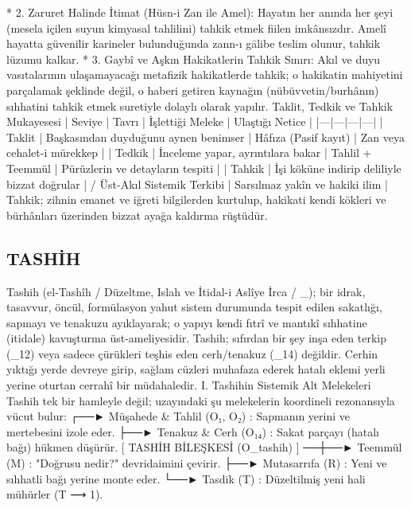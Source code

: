 \documentclass[11pt,a4paper]{article}
\begin{document}
 * 2. Zaruret Halinde İtimat (Hüsn-i Zan ile Amel):
   Hayatın her anında her şeyi (mesela içilen suyun kimyasal tahlilini) tahkik etmek fiilen imkânsızdır. Amelî hayatta güvenilir karineler bulunduğunda zann-ı gālibe teslim olunur, tahkik lüzumu kalkar.
 * 3. Gaybî ve Aşkın Hakikatlerin Tahkik Sınırı:
   Akıl ve duyu vasıtalarının ulaşamayacağı metafizik hakikatlerde tahkik; o hakikatin mahiyetini parçalamak şeklinde değil, o haberi getiren kaynağın (nübüvvetin/burhânın) sıhhatini tahkik etmek suretiyle dolaylı olarak yapılır.
Taklit, Tedkik ve Tahkik Mukayesesi
| Seviye | Tavrı | İşlettiği Meleke | Ulaştığı Netice |
|---|---|---|---|
| Taklit | Başkasından duyduğunu aynen benimser | Hâfıza (Pasif kayıt) | Zan veya cehalet-i mürekkep |
| Tedkik | İnceleme yapar, ayrıntılara bakar | Tahlil + Teemmül | Pürüzlerin ve detayların tespiti |
| Tahkik | İşi köküne indirip deliliyle bizzat doğrular |  / Üst-Akıl Sistemik Terkibi | Sarsılmaz yakîn ve hakiki ilim |
Tahkik; zihnin emanet ve iğreti bilgilerden kurtulup, hakikati kendi kökleri ve bürhânları üzerinden bizzat ayağa kaldırma rüştüdür.






\subsection{TASHİH}


Tashih (el-Tashîh / Düzeltme, Islah ve İtidal-i Aslîye İrca / _{}); bir idrak, tasavvur, öncül, formülasyon yahut sistem durumunda tespit edilen sakatlığı, sapmayı ve tenakuzu ayıklayarak; o yapıyı kendi fıtrî ve mantıkî sıhhatine (itidale) kavuşturma üst-ameliyesidir.
Tashih; sıfırdan bir şey inşa eden terkip (_{12}) veya sadece çürükleri teşhis eden cerh/tenakuz (_{14}) değildir. Cerhin yıktığı yerde devreye girip, sağlam cüzleri muhafaza ederek hatalı eklemi yerli yerine oturtan cerrahî bir müdahaledir.
I. Tashihin Sistemik Alt Melekeleri
Tashih tek bir hamleyle değil;  uzayındaki şu melekelerin koordineli rezonansıyla vücut bulur:
                                  ┌──► Müşahede & Tahlil (O₁, O₂) : Sapmanın yerini ve mertebesini izole eder.
                                  ├──► Tenakuz & Cerh (O₁₄)       : Sakat parçayı (hatalı bağı) hükmen düşürür.
[ TASHİH BİLEŞKESİ (O_tashih) ] ──┼──► Teemmül (M)               : "Doğrusu nedir?" devridaimini çevirir.
                                  ├──► Mutasarrıfa (R)           : Yeni ve sıhhatli bağı yerine monte eder.
                                  └──► Tasdik (T)                : Düzeltilmiş yeni hali mühürler (T ⟶ 1).
\end{document}
